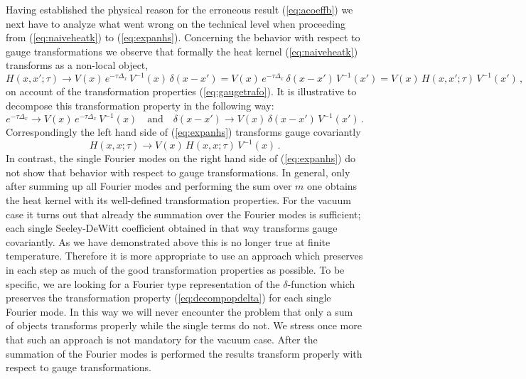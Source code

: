 \documentclass[a4paper,showpacs,showkeys,prd,nofootinbib]{revtex4}
\begin{document}
Having established the physical reason for the erroneous result (\ref{eq:acoeffb})
we next have to analyze what went wrong on the technical level when proceeding from
(\ref{eq:naiveheatk}) to (\ref{eq:expanhs}). Concerning the behavior with respect
to gauge transformations we observe that formally the heat kernel (\ref{eq:naiveheatk}) 
transforms as a non-local object,
\begin{equation}
  \label{eq:trafoheat}
H(x,x';\tau) \to V(x)\, e^{-\tau \Delta_x} \, V^{-1}(x)\, \delta(x-x') =
V(x)\, e^{-\tau \Delta_x} \, \delta(x-x') \, V^{-1}(x') =
V(x)\, H(x,x';\tau)  \, V^{-1}(x')  \,,
\end{equation}
on account of the transformation properties (\ref{eq:gaugetrafo}). It is illustrative
to decompose this transformation property in the following way:
\begin{equation}
  \label{eq:decompopdelta}
e^{-\tau \Delta_x} \to V(x)\, e^{-\tau \Delta_x} \, V^{-1}(x) \quad \mbox{and}
\quad \delta(x-x') \to V(x)\, \delta(x-x')  \, V^{-1}(x') \,.
\end{equation}
Correspondingly the left hand side of (\ref{eq:expanhs})
transforms gauge covariantly
\begin{equation}
  \label{eq:trafoheatdiag}
H(x,x;\tau) \to V(x)\, H(x,x;\tau)  \, V^{-1}(x)   \,.
\end{equation}
In contrast, the single Fourier modes on the right hand side of 
(\ref{eq:expanhs}) do not show that behavior with respect to gauge transformations.
In general, only after summing up all Fourier modes and performing the sum over $m$ one 
obtains the heat kernel with its well-defined transformation properties. For the
vacuum case it turns out that already the summation over the Fourier modes is sufficient;
each single Seeley-DeWitt coefficient obtained in that way transforms gauge covariantly.
As we have demonstrated above this is no longer true at finite temperature. Therefore
it is more appropriate to use an approach which preserves in each step as much of the 
good transformation properties as possible. To be specific, we are looking for a 
Fourier type
representation of the $\delta$-function which preserves the transformation property
(\ref{eq:decompopdelta}) for each single Fourier mode. In this way we will never 
encounter the problem that
only a sum of objects transforms properly while the single terms do not. We stress
once more that such an approach is not mandatory for the vacuum case. After the 
summation of the Fourier modes is performed the results transform properly with respect
to gauge transformations.
\end{document}

